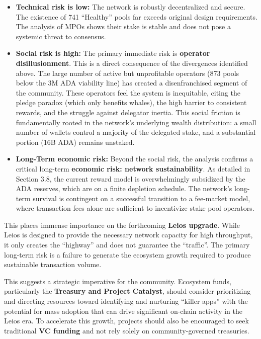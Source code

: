 \documentclass[11pt, letterpaper]{article}
\begin{document}
\begin{itemize}
	\item \textbf{Technical risk is low:} The network is robustly decentralized and secure. The existence
	      of 741 ``Healthy'' pools far exceeds original design requirements. The analysis of MPOs shows their stake
	      is stable and does not pose a systemic threat to consensus.
	\item \textbf{Social risk is high:} The primary immediate risk is \textbf{operator disillusionment}.
	      This is a direct consequence of the divergences identified above. The large number of active but unprofitable
	      operators (873 pools below the 3M ADA viability line) has created a disenfranchised segment of the community.
	      These operators feel the system is inequitable, citing the pledge paradox (which only benefits whales), the
	      high barrier to consistent rewards, and the struggle against delegator inertia. This social friction is
	      fundamentally rooted in the network's underlying wealth distribution: a small number of wallets control a
	      majority of the delegated stake, and a substantial portion (16B ADA) remains unstaked.
	\item \textbf{Long-Term economic risk:} Beyond the social risk, the analysis confirms a critical
	      long-term \textbf{economic risk: network sustainability}. As detailed in Section 3.8, the current reward
	      model is overwhelmingly subsidized by the ADA reserves, which are on a finite depletion schedule. The
	      network's long-term survival is contingent on a successful transition to a fee-market model, where transaction
	      fees alone are sufficient to incentivize stake pool operators.
\end{itemize}

This places immense importance on the forthcoming \textbf{Leios upgrade}. While Leios is designed to provide the
necessary network capacity for high throughput, it only creates the ``highway'' and does not guarantee the ``traffic''.
The primary long-term risk is a failure to generate the ecosystem growth required to produce sustainable
transaction volume.

This suggests a strategic imperative for the community. Ecosystem funds, particularly
the \textbf{Treasury and Project Catalyst}, should consider prioritizing and directing resources
toward identifying and nurturing ``killer apps'' with the potential for mass adoption that
can drive significant on-chain activity in the Leios era. To accelerate this growth, projects should
also be encouraged to seek traditional \textbf{VC funding} and not rely solely on community-governed treasuries.
\end{document}
